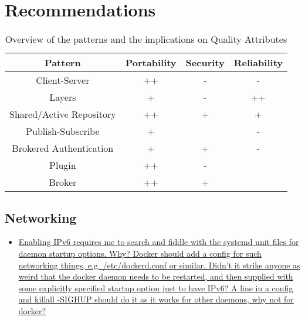 
\clearpage
\chapter{Recommendations}
\label{ch:recommendations}
%

\begin{center}
\begin{table}[H]
\begin{tabular}{|c|c|c|c|}
\hline \textbf{Pattern} & \textbf{Portability} & \textbf{Security} & \textbf{Reliability} \\ 
\hline Client-Server & ++ & - & - \\ 
\hline Layers & + & - & ++ \\ 
\hline Shared/Active Repository & ++ & + & + \\ 
\hline Publish-Subscribe & + &  & - \\ 
\hline Brokered Authentication & + & + & - \\ 
\hline Plugin & ++ & - &  \\ 
\hline Broker & ++ & + &  \\ 
\hline 
\end{tabular} 
\caption{Overview of the patterns and the implications on Quality Attributes}
\end{table}
\end{center}


\section{Networking}

\begin{itemize}

\item \href{%
https://groups.google.com/forum/#!topic/docker-user/TgCGntvTAjs
}{%
Enabling IPv6 requires me to search and fiddle with the systemd unit files for daemon startup options. Why? Docker should add a config for such networking things, e.g. /etc/dockerd.conf or similar. Didn't it strike anyone as weird that the docker daemon needs to be restarted, and then supplied with some explicitly specified startup option just to have IPv6? A line in a config and killall -SIGHUP should do it as it works for other daemons, why not for docker?
}

\end{itemize}

